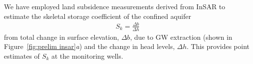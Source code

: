We have employed land subsidence measurements derived from InSAR to estimate the skeletal storage coefficient of the confined aquifer
\begin{align}
  S_{k} = \frac{\Delta b}{\Delta h}
\label{eq:elastic}  
\end{align}
from total change in surface elevation, $\Delta b$, due to GW extraction (shown in Figure~\ref{fig:prelim insar}\emph{a}) and the change in head levels, $\Delta h$. This provides point estimates of $S_k$ at the monitoring wells.



